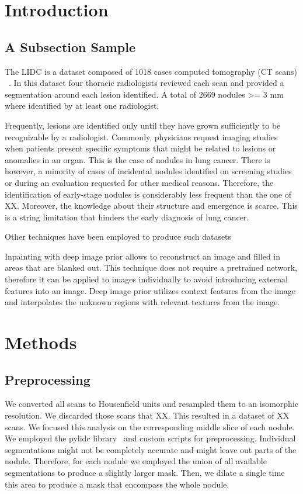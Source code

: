 \documentclass[runningheads]{llncs}
\begin{document}
\section{Introduction}
\subsection{A Subsection Sample}
The LIDC is a dataset composed of 1018 cases computed tomography (CT scans) ~\cite{pmid21452728}. In this dataset four thoracic radiologists reviewed each scan and provided a segmentation around each lesion identified. A total of 2669 nodules >= 3 mm where identified by at least one radiologist. 

Frequently, lesions are identified only until they have grown sufficiently to be recognizable by a radiologist. Commonly, physicians request imaging studies when patients present specific symptoms that might be related to lesions or anomalies in an organ. This is the case of nodules in lung cancer. There is however, a minority of cases of incidental nodules identified on screening studies or during an evaluation requested for other medical reasons. Therefore, the identification of early-stage nodules is considerably less frequent than the one of XX. Moreover, the knowledge about their structure and emergence is scarce. This is a string limitation that hinders the early diagnosis of lung cancer.

Other techniques have been employed to produce such datasets~\cite{DBLP:journals/corr/abs-1810-10850} 

Inpainting with deep image prior allows to reconstruct an image and filled in areas that are blanked out. This technique does not require a pretrained network, therefore it can be applied to images individually to avoid introducing external features into an image. Deep image prior utilizes context features from the image and interpolates the unknown regions with relevant textures from the image\cite{DBLP:journals/corr/abs-1711-10925}. 

\section{Methods}
\subsection{Preprocessing}
We converted all scans to Housenfield units and resampled them to an isomorphic resolution. We discarded those scans that XX. This resulted in a dataset of XX scans. We focused this analysis on the corresponding middle slice of each nodule. We employed the pylidc library~\cite{pylidc} and custom scripts for preprocessing. Individual segmentations might not be completely accurate and might leave out parts of the nodule. Therefore, for each nodule we employed the union of all available segmentations to produce a slightly larger mask. Then, we dilate a single time this area to produce a mask that encompass the whole nodule.  
\end{document}
